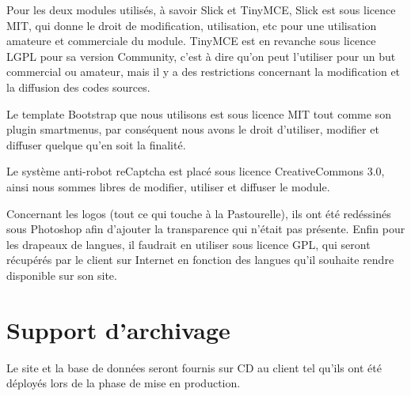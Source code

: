 \documentclass[11pt]{report}
\begin{document}
\par Pour les deux modules utilisés, à savoir Slick et TinyMCE, Slick est sous
licence MIT, qui donne le droit de modification, utilisation, etc pour une
utilisation amateure et commerciale du module. TinyMCE est en revanche sous
licence LGPL pour sa version Community, c'est à dire qu'on peut l'utiliser pour
un but commercial ou amateur, mais il y a des restrictions concernant la
modification et la diffusion des codes sources. \\

\par Le template Bootstrap que nous utilisons est sous licence MIT tout comme
son plugin smartmenus, par conséquent nous avons le droit d'utiliser, modifier
et diffuser quelque qu'en soit la finalité. \\

\par Le système anti-robot reCaptcha est placé sous licence CreativeCommons 3.0,
ainsi nous sommes libres de modifier, utiliser et diffuser le module. \\

\par Concernant les logos (tout ce qui touche à la Pastourelle), ils ont été
redéssinés sous Photoshop afin d'ajouter la transparence qui n'était pas
présente. Enfin pour les drapeaux de langues, il faudrait en utiliser sous
licence GPL, qui seront récupérés par le client sur Internet en fonction des
langues qu'il souhaite rendre disponible sur son site.

\section{Support d'archivage}
Le site et la base de données seront fournis sur CD au client tel qu'ils
ont été déployés lors de la phase de mise en production.
\end{document}
